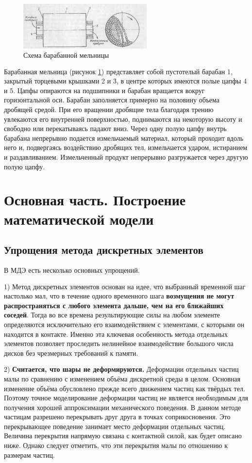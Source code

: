 \documentclass[a4paper]{article}
\begin{document}
\begin{figure}[H]
	\centering
	\includegraphics[width=0.6\textwidth]{baraban_shema}
	\caption{Схема барабанной мельницы}
	\label{pic:baraban_shema}
\end{figure} 

Барабанная мельница (рисунок \ref{pic:baraban_shema}) представляет собой пустотелый барабан 1, закрытый торцевыми крышками 2 и 3, в центре которых имеются полые цапфы 4 и 5. 
Цапфы опираются на подшипники и барабан вращается вокруг горизонтальной оси.
Барабан заполняется примерно на половину объема дробящей средой.
При его вращении дробящие тела  благодаря трению увлекаются его внутренней поверхностью, поднимаются на некоторую высоту и свободно или перекатываясь падают вниз.
Через одну полую цапфу внутрь барабана непрерывно подается измельчаемый материал, который проходит вдоль него и, подвергаясь воздействию дробящих тел, измельчается ударом, истиранием и раздавливанием.
Измельченный продукт непрерывно разгружается через другую полую цапфу.


\newpage

\section{Основная часть. Построение математической модели}

\subsection{Упрощения метода дискретных элементов}
В МДЭ есть несколько основных упрощений. 

1) Метод дискретных элементов основан на идее, что выбранный временной шаг настолько мал, что в течение одного временного шага \textbf{возмущения не могут распространяться с любого элемента дальше, чем на его ближайших соседей}. 
Тогда во все времена результирующие силы на любом элементе определяются исключительно его взаимодействием с элементами, с которыми он находится в контакте.
Именно эта ключевая особенность метода отдельных элементов позволяет проследить нелинейное взаимодействие большого числа дисков без чрезмерных требований к памяти.

2) \textbf{Считается, что шары не деформируются.}
Деформации отдельных частиц малы по сравнению с изменением объёма дискретной среды в целом. 
Основная изменение объёма обусловлено прежде всего движением частиц как твёрдых тел. 
Поэтому точное моделирование деформации частиц не является необходимым для получения хорошей аппроксимации механического поведения. 
В данном методе частицам разрешено перекрывать друг друга в точках соприкосновения. 
Это перекрывающее поведение занимает место деформации отдельных частиц. 
Величина перекрытия напрямую связана с контактной силой, как будет описано ниже.
Однако следует отметить, что эти перекрытия малы по отношению к размерам частиц.
\end{document}
